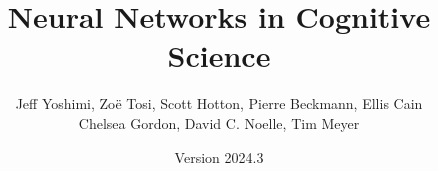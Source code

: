 \documentclass[oneside]{book}
\begin{document}
\title{Neural Networks in Cognitive Science}
\author{Jeff Yoshimi, Zo\"e Tosi, Scott Hotton, Pierre Beckmann, Ellis Cain\\ Chelsea Gordon, David C. Noelle, Tim Meyer}
\date{Version 2024.3}  %
\maketitle

\tableofcontents





















\appendix


{} 
\listoffigures

{} 
{}

\end{document}
